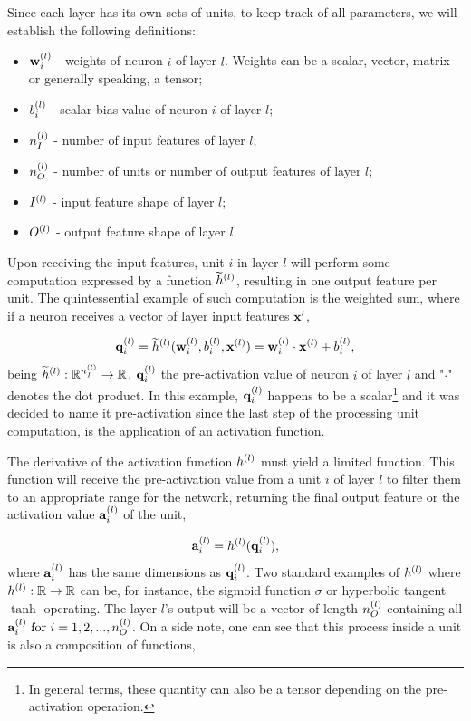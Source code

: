 Since each layer has its own sets of units, to keep track of all parameters, we will establish the following definitions:

\begin{itemize}
	\item $ \mathbf{w}^{(l)}_{i} $ - weights of neuron $ i $ of layer $ l $. Weights can be a scalar, vector, matrix or generally speaking, a tensor;
	\item $ b^{(l)}_{i} $ - scalar bias value of neuron $ i $ of layer $ l $;
	\item $ n^{(l)}_{I} $ - number of input features of layer $ l $;
	\item $ n^{(l)}_{O} $ - number of units or number of output features of layer $ l $;
	\item $ I^{(l)} $ - input feature shape of layer $ l $;
	\item $ O^{(l)} $ - output feature shape of layer $ l $.
\end{itemize}

Upon receiving the input features, unit $ i $ in layer $ l $ will perform some computation expressed by a function $ \widetilde{h}^{(l)} $, resulting in one output feature per unit. The quintessential example of such computation is the weighted sum, where if a neuron receives a vector of layer input features $ \mathbf{x}' $,

\begin{equation}
	\mathbf{q}^{(l)}_{i} = \widetilde{h}^{(l)}(\mathbf{w}^{(l)}_{i}, b^{(l)}_{i}, \mathbf{x}^{(l)}) = \mathbf{w}^{(l)}_{i} \cdot \mathbf{x}^{(l)} + b^{(l)}_{i},
	\label{eq:pact_weighted_sum}
\end{equation}
being $ \widetilde{h}^{(l)}:  \mathbb{R}^{n^{(l)}_{I}} \rightarrow \mathbb{R} $, $ \mathbf{q}^{(l)}_{i} $ the pre-activation value of neuron $ i $ of layer $ l $ and "$ \cdot $" denotes the dot product. In this example, $ \mathbf{q}^{(l)}_{i} $ happens to be a scalar\footnote{In general terms, these quantity can also be a tensor depending on the pre-activation operation.} and it was decided to name it pre-activation since the last step of the processing unit computation, is the application of an activation function.

The derivative of the activation function $ h^{(l)} $ must yield a limited function. This function will receive the pre-activation value from a unit $ i $ of layer $ l $ to filter them to an appropriate range for the network, returning the final output feature or the activation value $ \mathbf{a}^{(l)}_{i} $ of the unit,

\begin{equation}
	\mathbf{a}^{(l)}_{i} = h^{(l)}(\mathbf{q}^{(l)}_{i}),
	\label{eq:act}
\end{equation}
where $ \mathbf{a}^{(l)}_{i} $ has the same dimensions as $ \mathbf{q}^{(l)}_{i} $. Two standard examples of $ h^{(l)} $ where $ h^{(l)}: \mathbb{R} \rightarrow \mathbb{R} $ can be, for instance, the sigmoid function $ \sigma $ or hyperbolic tangent $ \tanh $ operating. The layer $ l $'s output will be a vector of length $ n^{(l)}_{O} $ containing all $ \mathbf{a}^{(l)}_{i} \ \text{for} \ i = 1, 2, ..., n^{(l)}_{O} $. On a side note, one can see that this process inside a unit is also a composition of functions,


